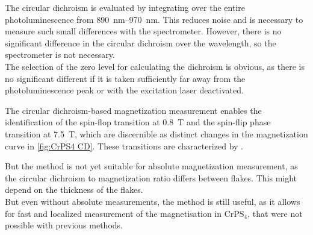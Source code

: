 \documentclass[
	oneside,
	parskip=half,
	a4paper,
]{scrbook}
\begin{document}
The circular dichroism is evaluated by integrating over the entire photoluminescence from \SIrange{890}{970}{nm}.
This reduces noise and is necessary to measure such small differences with the spectrometer.
However, there is no significant difference in the circular dichroism over the wavelength, so the spectrometer is not necessary.\\
The selection of the zero level for calculating the dichroism is obvious, as there is no significant different if it is taken sufficiently far away from the photoluminescence peak or with the excitation laser deactivated.

The circular dichroism-based magnetization measurement enables the identification of the spin-flop transition at \SI{.8}{T} and the spin-flip phase transition at \SI{7.5}{T}, which are discernible as distinct changes in the magnetization curve in \autoref{fig:CrPS4 CD}.
These transitions are characterized by \cite{CrPS4_magnetic}. 

But the method is not yet suitable for absolute magnetization measurement, as the circular dichroism to magnetization ratio differs between flakes.
This might depend on the thickness of the flakes.\\
But even without absolute measurements, the method is still useful, as it allows for fast and localized measurement of the magnetisation in CrPS$_4$, that were not possible with previous methods.


\end{document}

